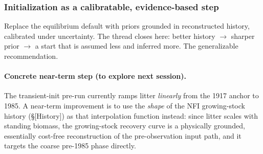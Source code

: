 \documentclass[11pt]{article}
\begin{document}
\subsubsection{Initialization as a calibratable, evidence-based step}
Replace the equilibrium default with priors grounded in reconstructed history,
calibrated under uncertainty. The thread closes here: better history $\to$
sharper prior $\to$ a start that is assumed less and inferred more. The
generalizable recommendation.

\paragraph{Concrete near-term step (to explore next session).}
The transient-init pre-run currently ramps litter \emph{linearly} from the 1917
anchor to 1985. A near-term improvement is to use the \emph{shape} of the NFI
growing-stock history (\S[History]) as that interpolation function instead: since
litter scales with standing biomass, the growing-stock recovery curve is a
physically grounded, essentially cost-free reconstruction of the pre-observation
input path, and it targets the coarse pre-1985 phase directly.
\end{document}
